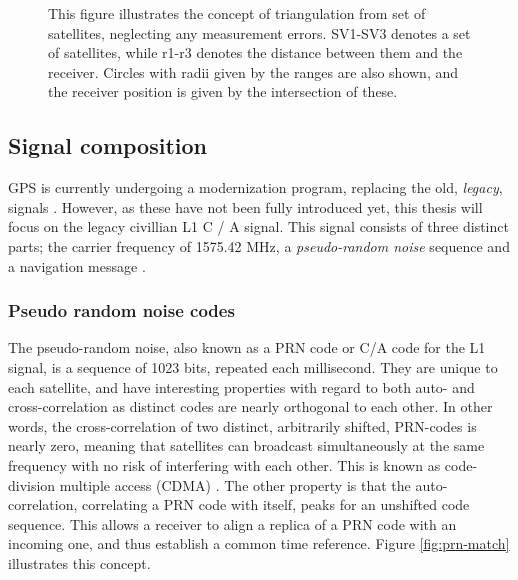 \begin{figure}
    \centering
    
    \caption[Triangulation principle]{This figure illustrates the concept of triangulation from set of satellites, neglecting any measurement errors. SV1-SV3 denotes a set of satellites, while r1-r3 denotes the distance between them and the receiver. Circles with radii given by the ranges are also shown, and the receiver position is given by the intersection of these.}
    \label{fig:pos-est}
\end{figure}

\subsection{Signal composition}
GPS is currently undergoing a modernization program, replacing the old, \textit{legacy}, signals \cite{groves2013principles, farrell2008aided}. However, as these have not been fully introduced yet, this thesis will focus on the legacy civillian L1 C / A signal. This signal consists of three distinct parts; the carrier frequency of 1575.42 MHz, a \textit{pseudo-random noise} sequence and a navigation message \cite{misra2006global}. 

\subsubsection{Pseudo random noise codes}
The pseudo-random noise, also known as a PRN code or C/A code for the L1 signal, is a sequence of 1023 bits, repeated each millisecond. They are unique to each satellite, and have interesting properties with regard to both auto- and cross-correlation as distinct codes are nearly orthogonal to each other. In other words, the cross-correlation of two distinct, arbitrarily shifted, PRN-codes is nearly zero, meaning that satellites can broadcast simultaneously at the same frequency with no risk of interfering with each other. This is known as code-division multiple access (CDMA) \cite{groves2013principles}. The other property is that the auto-correlation, correlating a PRN code with itself, peaks for an unshifted code sequence. This allows a receiver to align a replica of a PRN code with an incoming one, and thus establish a common time reference. Figure \ref{fig:prn-match} illustrates this concept.\\

